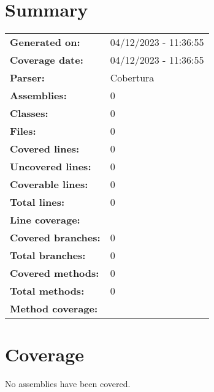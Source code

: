 \documentclass[a4paper,landscape,10pt]{article}
\begin{document}
\setcounter{secnumdepth}{-1}
\section{Summary}
\begin{longtable}[l]{ll}
\textbf{Generated on:} & 04/12/2023 - 11:36:55\\
\textbf{Coverage date:} & 04/12/2023 - 11:36:55\\
\textbf{Parser:} & Cobertura\\
\textbf{Assemblies:} & 0\\
\textbf{Classes:} & 0\\
\textbf{Files:} & 0\\
\textbf{Covered lines:} & 0\\
\textbf{Uncovered lines:} & 0\\
\textbf{Coverable lines:} & 0\\
\textbf{Total lines:} & 0\\
\textbf{Line coverage:} & \\
\textbf{Covered branches:} & 0\\
\textbf{Total branches:} & 0\\
\textbf{Covered methods:} & 0\\
\textbf{Total methods:} & 0\\
\textbf{Method coverage:} & \\
\end{longtable}
\section{Coverage}
No assemblies have been covered.
\end{document}
